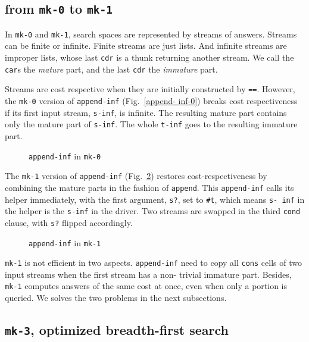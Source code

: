 \documentclass[format=acmlarge, review=true, authordraft=true]{acmart}
\begin{document}


\subsection{from \texttt{mk-0} to \texttt{mk-1}}

In \texttt{mk-0} and \texttt{mk-1}, search spaces are represented by streams of 
answers. Streams can be finite or infinite. Finite streams are just lists. And 
infinite streams are improper lists, whose last \texttt{cdr} is a thunk 
returning another stream. We call the \texttt{car}s the \emph{mature} part, and 
the last \texttt{cdr} the \emph{immature} part. 

Streams are cost respective when they are initially constructed by \texttt{==}. 
However, the \texttt{mk-0} version of \texttt{append-inf} (Fig.~\ref{append-
inf-0}) breaks cost respectiveness if its first input stream, \texttt{s-inf}, 
is infinite. The resulting mature part contains only the mature part of 
\texttt{s-inf}. The whole \texttt{t-inf} goes to the resulting immature part.

\begin{figure}
	 	
	 \caption{\texttt{append-inf} in \texttt{mk-0}}
	 \label{append-inf-0}
\end{figure}

The \texttt{mk-1} version of \texttt{append-inf} (Fig.~\ref{append-inf-1}) 
restores cost-respectiveness by combining the mature parts in the fashion of 
\texttt{append}. This \texttt{append-inf} calls its helper immediately, with 
the first argument, \texttt{s?}, set to \texttt{\#{}t}, which means \texttt{s-
inf} in the helper is the \texttt{s-inf} in the driver. Two streams are swapped 
in the third \texttt{cond} clause, with \texttt{s?} flipped accordingly.

\begin{figure}
	 	
	 \caption{\texttt{append-inf} in \texttt{mk-1}}
	 \label{append-inf-1}
\end{figure}

\texttt{mk-1} is not efficient in two aspects. \texttt{append-inf} need to copy 
all \texttt{cons} cells of two input streams when the first stream has a non-
trivial immature part. Besides, \texttt{mk-1} computes answers of the same cost 
at once, even when only a portion is queried. We solves the two problems in the 
next subsections.

\subsection{\texttt{mk-3}, optimized breadth-first search}
\end{document}

